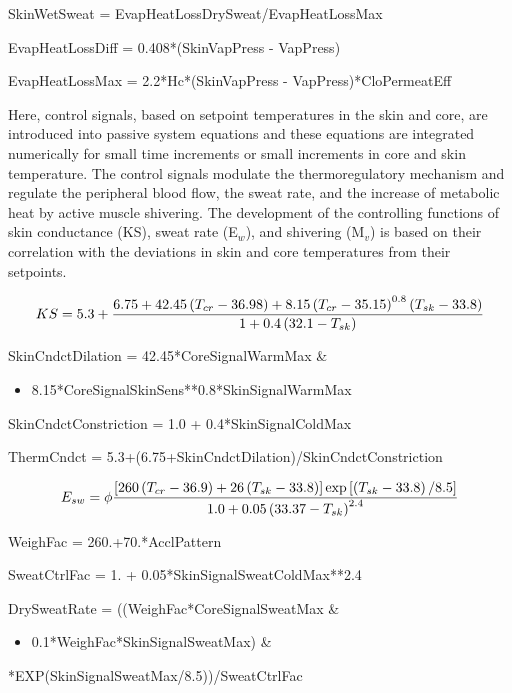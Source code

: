 SkinWetSweat = EvapHeatLossDrySweat/EvapHeatLossMax

EvapHeatLossDiff = 0.408*(SkinVapPress - VapPress)

EvapHeatLossMax = 2.2*Hc*(SkinVapPress - VapPress)*CloPermeatEff

Here, control signals, based on setpoint temperatures in the skin and core, are introduced into passive system equations and these equations are integrated numerically for small time increments or small increments in core and skin temperature. The control signals modulate the thermoregulatory mechanism and regulate the peripheral blood flow, the sweat rate, and the increase of metabolic heat by active muscle shivering. The development of the controlling functions of skin conductance (KS), sweat rate (E\(_{w}\)), and shivering (M\(_{v}\)) is based on their correlation with the deviations in skin and core temperatures from their setpoints.

\begin{equation}
  KS = 5.3 + \frac{6.75+42.45\PB{T_{cr}-36.98}+8.15\PB{T_{cr}-35.15}^{0.8}\PB{T_{sk}-33.8}}{1+0.4\PB{32.1-T_{sk}}}
\end{equation}

SkinCndctDilation = 42.45*CoreSignalWarmMax \&

\begin{itemize}
\tightlist
\item
  8.15*CoreSignalSkinSens**0.8*SkinSignalWarmMax
\end{itemize}

SkinCndctConstriction = 1.0 + 0.4*SkinSignalColdMax

ThermCndct = 5.3+(6.75+SkinCndctDilation)/SkinCndctConstriction

\begin{equation}
  E_{sw} = \phi \frac{\RB{260\PB{T_{cr} - 36.9} + 26\PB{T_{sk} - 33.8}} \exp\RB{\PB{T_{sk} - 33.8}/8.5}}{1.0 + 0.05\PB{33.37 - T_{sk}}^{2.4}}
\end{equation}

WeighFac = 260.+70.*AcclPattern

SweatCtrlFac = 1. + 0.05*SkinSignalSweatColdMax**2.4

DrySweatRate = ((WeighFac*CoreSignalSweatMax \&

\begin{itemize}
\tightlist
\item
  0.1*WeighFac*SkinSignalSweatMax) \&
\end{itemize}

*EXP(SkinSignalSweatMax/8.5))/SweatCtrlFac

